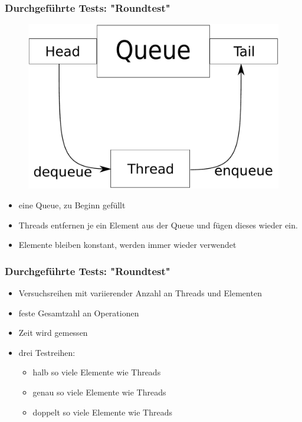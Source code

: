 \documentclass[svgnames]{beamer}
\begin{document}
\begin{frame}
\frametitle{Durchgef\"uhrte Tests: "Roundtest"}
\begin {figure}
      \begin{center}
	\includegraphics[scale=0.25]{round.pdf}
     \end{center}
\end {figure}

\begin{itemize}
 \item eine Queue, zu Beginn gef\"ullt
 \item Threads entfernen je ein Element aus der Queue und f\"ugen dieses wieder ein.
 \item Elemente bleiben konstant, werden immer wieder verwendet
\end{itemize}
\end{frame}
\begin{frame}
\frametitle{Durchgef\"uhrte Tests: "Roundtest"}
\begin{itemize}
 \item Versuchsreihen mit variierender Anzahl an Threads und Elementen
 \item feste Gesamtzahl an Operationen
 \item Zeit wird gemessen
 \item drei Testreihen:
\begin{itemize}
 \item halb so viele Elemente wie Threads
 \item genau so viele Elemente wie Threads
 \item doppelt so viele Elemente wie Threads
\end{itemize}
\end{itemize}
\end{frame}
\end{document}
